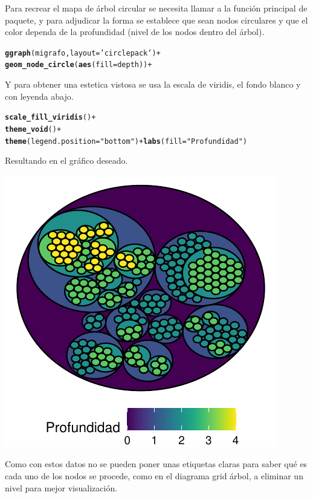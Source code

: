 \documentclass{article}\usepackage[]{graphicx}\usepackage[]{color}
\makeatletter
\def\maxwidth{ %
  \ifdim\Gin@nat@width>\linewidth
    \linewidth
  \else
    \Gin@nat@width
  \fi
}
\newcommand{\hlstr}[1]{\textcolor[rgb]{0.192,0.494,0.8}{#1}}%
\newcommand{\hlopt}[1]{\textcolor[rgb]{0,0,0}{#1}}%
\newcommand{\hlstd}[1]{\textcolor[rgb]{0.345,0.345,0.345}{#1}}%
\newcommand{\hlkwc}[1]{\textcolor[rgb]{0.333,0.667,0.333}{#1}}%
\newcommand{\hlkwd}[1]{\textcolor[rgb]{0.737,0.353,0.396}{\textbf{#1}}}%
\newenvironment{kframe}{%
 \def\at@end@of@kframe{}%
 \ifinner\ifhmode%
  \def\at@end@of@kframe{\end{minipage}}%
  \begin{minipage}{\columnwidth}%
 \fi\fi%
 \def\FrameCommand##1{\hskip\@totalleftmargin \hskip-\fboxsep
 \colorbox{shadecolor}{##1}\hskip-\fboxsep
     \hskip-\linewidth \hskip-\@totalleftmargin \hskip\columnwidth}%
 \MakeFramed {\advance\hsize-\width
   \@totalleftmargin\z@ \linewidth\hsize
   \@setminipage}}%
 {\par\unskip\endMakeFramed%
 \at@end@of@kframe}
\newenvironment{knitrout}{}{} %
\makeatother
\begin{document}
Para recrear el mapa de \'arbol circular se necesita llamar a la funci\'on principal de paquete, y para adjudicar la forma se establece que sean nodos circulares y que el color dependa de la profundidad (nivel de los nodos dentro del \'arbol).
\begin{knitrout}
\color{fgcolor}\begin{kframe}
\begin{alltt}
\hlkwd{ggraph}(migrafo, layout = \hlstr{'circlepack'}) +
  \hlkwd{geom_node_circle}(\hlkwd{aes}(fill = depth)) +
\end{alltt}
\end{kframe}
\end{knitrout}
Y para obtener una estetica vistosa se usa la escala de viridis, el fondo blanco y con leyenda abajo.
\begin{knitrout}
\color{fgcolor}\begin{kframe}
\begin{alltt}
  \hlkwd{scale_fill_viridis}\hlstd{()} \hlopt{+}
  \hlkwd{theme_void}\hlstd{()} \hlopt{+}
  \hlkwd{theme}\hlstd{(}\hlkwc{legend.position} \hlstd{=} \hlstr{"bottom"}\hlstd{)} \hlopt{+} \hlkwd{labs}\hlstd{(}\hlkwc{fill} \hlstd{=} \hlstr{"Profundidad"}\hlstd{)}
\end{alltt}
\end{kframe}
\end{knitrout}
Resultando en el gr\'afico deseado.
\begin{knitrout}
\color{fgcolor}

{\centering \includegraphics[width=\maxwidth]{figure/plot_ggraph-1} 

}



\end{knitrout}
Como con estos datos no se pueden poner unas etiquetas claras para saber qu\'e es cada uno de los nodos se procede, como en el diagrama grid \'arbol, a eliminar un nivel para mejor visualizaci\'on.
\end{document}
